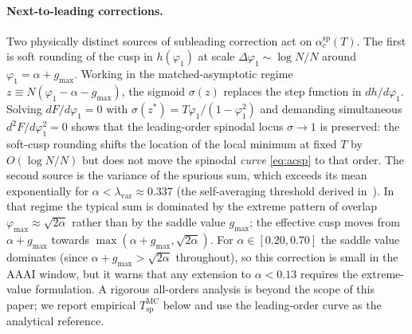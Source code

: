 \documentclass[11pt]{article}
\newcommand{\acSp}{\alpha_c^{\mathrm{sp}}}
\begin{document}
\paragraph{Next-to-leading corrections.}
\label{sec:mc:spinodal-nlo}
Two physically distinct sources of subleading correction act on
$\acSp(T)$. The first is soft rounding of the cusp in $h(\varphi_1)$
at scale $\Delta \varphi_1 \sim \log N/N$ around
$\varphi_1 = \alpha + g_{\max}$. Working in the matched-asymptotic
regime $z \equiv N(\varphi_1 - \alpha - g_{\max})$, the
sigmoid $\sigma(z)$ replaces the step function in $dh/d\varphi_1$.
Solving $dF/d\varphi_1 = 0$ with $\sigma(z^*) = T\varphi_1/(1-\varphi_1^2)$
and demanding simultaneous $d^2F/d\varphi_1^2 = 0$ shows that the
leading-order spinodal locus $\sigma \to 1$ is preserved: the
soft-cusp rounding shifts the location of the local minimum at
fixed $T$ by $O(\log N/N)$ but does not move the spinodal
\emph{curve} \eqref{eq:acsp} to that order. The second source is
the variance of the spurious sum, which exceeds its mean
exponentially for $\alpha < \lambda_{\mathrm{var}} \approx 0.337$
(the self-averaging threshold derived
in~\citep{petrova2026metastable}). In that regime the typical sum
is dominated by the extreme pattern of overlap
$\varphi_{\mathrm{max}} \approx \sqrt{2\alpha}$ rather than by the
saddle value $g_{\max}$; the effective cusp moves from
$\alpha + g_{\max}$ towards
$\max(\alpha + g_{\max},\sqrt{2\alpha})$. For $\alpha \in [0.20,
0.70]$ the saddle value dominates (since
$\alpha + g_{\max} > \sqrt{2\alpha}$ throughout), so this
correction is small in the AAAI window, but it warns that any
extension to $\alpha < 0.13$ requires the extreme-value
formulation. A rigorous all-orders analysis is beyond the scope of
this paper; we report empirical $T_{\mathrm{sp}}^{\mathrm{MC}}$
below and use the leading-order curve as the analytical
reference.
\end{document}
